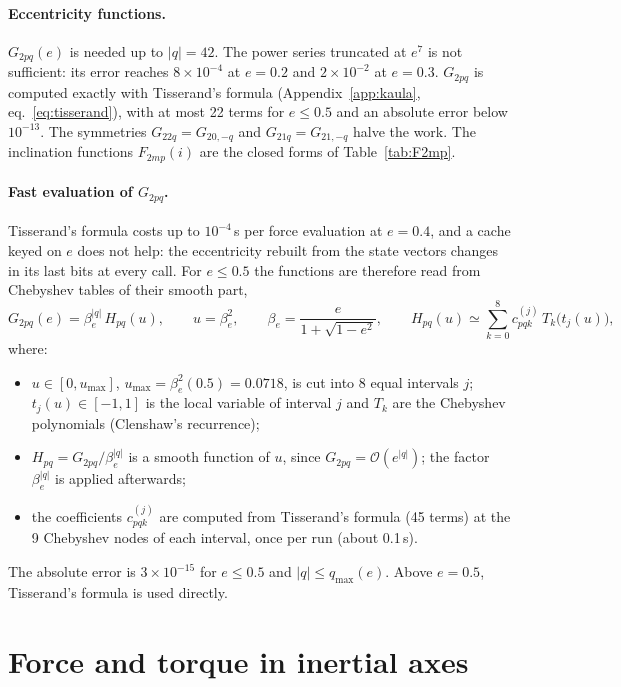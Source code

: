 \paragraph{Eccentricity functions.} $G_{2pq}(e)$ is needed up to $|q|=42$. The power series truncated at $e^{7}$ is not sufficient: its error reaches $8\times10^{-4}$ at $e=0.2$ and $2\times10^{-2}$ at $e=0.3$. $G_{2pq}$ is computed exactly with Tisserand's formula (Appendix~\ref{app:kaula}, eq.~\eqref{eq:tisserand}), with at most 22 terms for $e\le0.5$ and an absolute error below $10^{-13}$. The symmetries $G_{22q}=G_{20,-q}$ and $G_{21q}=G_{21,-q}$ halve the work. The inclination functions $F_{2mp}(i)$ are the closed forms of Table~\ref{tab:F2mp}.

\paragraph{Fast evaluation of $G_{2pq}$.} Tisserand's formula costs up to $10^{-4}$\,s per force evaluation at $e=0.4$, and a cache keyed on $e$ does not help: the eccentricity rebuilt from the state vectors changes in its last bits at every call. For $e\le0.5$ the functions are therefore read from Chebyshev tables of their smooth part,
\begin{equation}
  G_{2pq}(e)=\beta_e^{|q|}\,H_{pq}(u),\qquad u=\beta_e^2,\qquad \beta_e=\frac{e}{1+\sqrt{1-e^2}},\qquad
  H_{pq}(u)\simeq\sum_{k=0}^{8}c^{(j)}_{pqk}\,T_k\big(t_j(u)\big), \label{eq:G-table}
\end{equation}
where:
\begin{itemize}
  \item $u\in[0,u_{\max}]$, $u_{\max}=\beta_e^2(0.5)=0.0718$, is cut into 8 equal intervals $j$; $t_j(u)\in[-1,1]$ is the local variable of interval $j$ and $T_k$ are the Chebyshev polynomials (Clenshaw's recurrence);
  \item $H_{pq}=G_{2pq}/\beta_e^{|q|}$ is a smooth function of $u$, since $G_{2pq}=\mathcal O(e^{|q|})$; the factor $\beta_e^{|q|}$ is applied afterwards;
  \item the coefficients $c^{(j)}_{pqk}$ are computed from Tisserand's formula (45 terms) at the 9 Chebyshev nodes of each interval, once per run (about 0.1\,s).
\end{itemize}
The absolute error is $3\times10^{-15}$ for $e\le0.5$ and $|q|\le q_{\max}(e)$. Above $e=0.5$, Tisserand's formula is used directly.

\section{Force and torque in inertial axes}\label{sec:torque}
